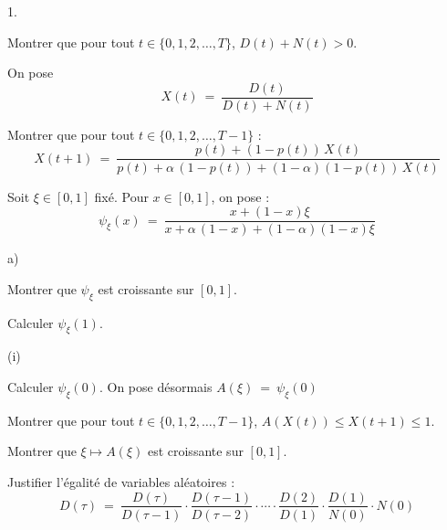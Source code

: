 \documentclass[11pt]{article}%
\begin{document}
\begin{noliste}{1.}
  \setlength{\itemsep}{4mm}
  \setcounter{enumi}{4}
  \item Montrer que pour tout $t \in \{0,1,2, \ldots, T\}$, $D(t) 
  +N(t) >0$.
  
  
  
  

  
  On pose
  \[
    X(t) \ = \ \dfrac{D(t)}{D(t) + N(t)}
  \]  
  
  \item Montrer que pour tout $t\in \{0,1,2, \ldots, T-1\}$ :
  \[
    X(t+1) \ = \ \dfrac{p(t) + (1-p(t)) \, X(t)}{p(t) + \alpha \, 
    (1-p(t)) + (1-\alpha)(1-p(t)) \, X(t)}
  \]
  
  

  
  \item Soit $\xi \in [0,1]$ fixé. Pour $x \in [0,1]$, on pose :
  \[
    \psi_\xi(x) \ = \ \dfrac{x+ (1-x) \xi}{x + \alpha \, (1-x) + 
    (1- \alpha)(1-x)\xi}
  \]
  \begin{noliste}{a)}
    \setlength{\itemsep}{2mm}
    \item Montrer que $\psi_\xi$ est croissante sur $[0,1]$.
    
    

    
    \item Calculer $\psi_\xi(1)$.
    
    

    
    \item 
    \begin{nonoliste}{(i)}
      \item Calculer $\psi_\xi(0)$. On pose désormais
      $
        A(\xi) \ = \ \psi_\xi(0)
      $
      
      
      
      

      
      \item Montrer que pour tout $t\in \{0,1,2, \ldots, T-1\}$, 
      $A(X(t)) \leq X(t+1) \leq 1$.
      
      

      
      \item Montrer que $\xi \mapsto A(\xi)$ est croissante sur $[0,1]$.
      
      
    \end{nonoliste}
  \end{noliste}
    
  \item Justifier l'égalité de variables aléatoires :
  \[
    D(\tau) \ = \ \dfrac{D(\tau)}{D(\tau-1)} \cdot \dfrac{D(\tau-1)}
    {D(\tau-2)} \cdot \cdots \cdot \dfrac{D(2)}{D(1)} \cdot 
    \dfrac{D(1)}{N(0)} \cdot N(0)
  \]
  

\end{noliste}
\end{document}
